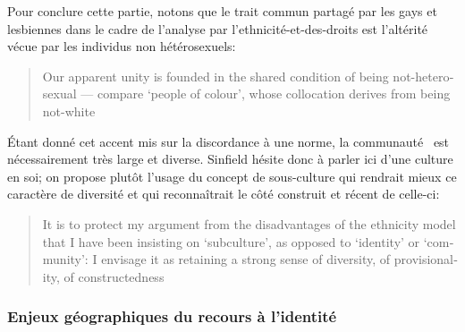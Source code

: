 Pour conclure cette partie, notons que le trait commun partagé par les gays et lesbiennes dans le cadre de l'analyse par l'ethnicité-et-des-droits est l'altérité vécue par les individus non hétérosexuels: \foreignblockquote{english}[{\cite[289]{Sinfield1996}}][.]{Our apparent unity is founded in the shared condition of being not-heterosexual --- compare `people of colour', whose collocation derives from being not-white}.
Étant donné cet accent mis sur la discordance à une norme, la communauté \lgbt\ est nécessairement très large et diverse.
Sinfield hésite donc à parler ici d'une culture en soi; on propose plutôt l'usage du concept de sous-culture qui rendrait mieux ce caractère de diversité et qui reconnaîtrait le côté construit et récent de celle-ci:
\foreignblockquote{english}[{\cite[289]{Sinfield1996}}][.]{It is to protect my argument from the disadvantages of the ethnicity model that I have been insisting on `subculture', as opposed to `identity' or `community': I envisage it as retaining a strong sense of diversity, of provisionality, of constructedness}.



\subsubsection{Enjeux géographiques du recours à l'identité}
\label{sec:enjeux_g_ographiques_du_recours_l_identit_}

